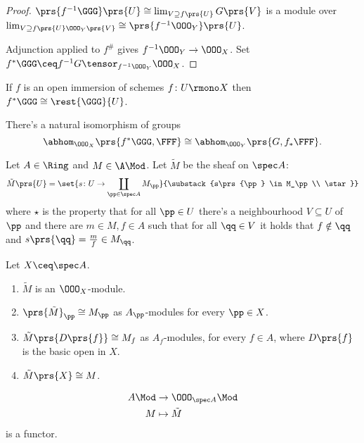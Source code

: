 \documentclass[10pt,a4paper,twoside,openany,hidelinks]{book}
\begin{document}
\begin{proof}
$\prs{f^{-1}\GGG}\prs{U} \cong \lim_{V \supseteq f\prs{U}} G\prs{V}$ is a module over $\lim_{V \supseteq f\prs{U} \OOO_Y\prs{V}} \cong \prs{f^{-1}\OOO_Y}\prs{U}$.

Adjunction applied to $f^\#$ gives $f^{-1}\OOO_Y \to \OOO_X$.
Set $f^* \GGG \ceq f^{-1}G \tensor_{f^{-1}\OOO_Y} \OOO_X$.
\end{proof}


\begin{remark}
If $f$ is an open immersion of schemes $f \colon U \rmono X$ then $f^* \GGG \cong \rest{\GGG}{U}$.
\end{remark}

\begin{fact}
There's a natural isomorphism of groups
\[\abhom_{\OOO_X}\prs{f^* \GGG, \FFF} \cong \abhom_{\OOO_Y}\prs{G, f_*\FFF} \text{.}\]
\end{fact}

\begin{definition}
Let $A \in \Ring$ and $M \in \A\Mod$. Let $\tilde{M}$ be the sheaf on $\spec A$:
\[\tilde{M}\prs{U} = \set{s \colon U \to \coprod_{\pp \in \spec A} M_\pp}{\substack{s\prs{\pp} \in M_\pp \\ \star}}\]
where $\star$ is the property that for all $\pp \in U$ there's a neighbourhood $V \subseteq U$ of $\pp$ and there are $m \in M, f \in A$ such that for all $\qq \in V$ it holds that $f \notin \qq$ and $s\prs{\qq} = \frac{m}{f} \in M_\qq$.
\end{definition}

\begin{proposition}
Let $X \ceq \spec A$.
\begin{enumerate}
\item $\tilde{M}$ is an $\OOO_X$-module.
\item $\prs{\tilde{M}}_\pp \cong M_\pp$ as $A_\pp$-modules for every $\pp \in X$.
\item $\tilde{M}\prs{D\prs{f}} \cong M_f$ as $A_f$-modules, for every $f \in A$, where $D\prs{f}$ is the basic open in $X$.
\item $\tilde{M}\prs{X} \cong M$.
\end{enumerate}
\end{proposition}

\begin{remark}
\begin{align*}
A\Mod &\to \OOO_{\spec A}\Mod \\
M &\mapsto \tilde{M}
\end{align*}
is a functor.
\end{remark}
\end{document}
